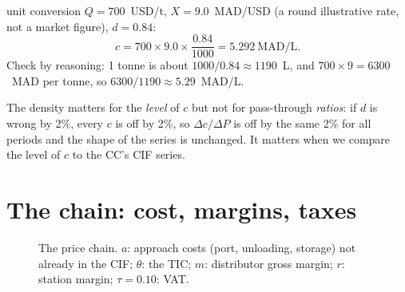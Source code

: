 \documentclass[11pt,a4paper]{article}
\theoremstyle{definition}
\newcommand{\MADL}{\text{MAD/L}}
\begin{document}
\begin{worked}{unit conversion}
$Q=700$~USD/t, $X=9.0$~MAD/USD (a round illustrative rate, not a market figure), $d=0.84$:
\[
c = 700 \times 9.0 \times \frac{0.84}{1000} = 5.292~\MADL .
\]
Check by reasoning: 1 tonne is about $1000/0.84 \approx 1190$~L, and $700\times 9 = 6300$~MAD per tonne,
so $6300/1190 \approx 5.29$~MAD/L.
\end{worked}

\begin{warning}
The density matters for the \emph{level} of $c$ but not for pass-through \emph{ratios}: if $d$ is
wrong by 2\%, every $c$ is off by 2\%, so $\Delta c/\Delta P$ is off by the same 2\% for all periods
and the shape of the series is unchanged. It matters when we compare the level of $c$ to the CC's
CIF series.
\end{warning}

\section{The chain: cost, margins, taxes}

\begin{figure}[H]
\centering
{}
\caption{The price chain. $a$: approach costs (port, unloading, storage) not already in the CIF;
$\theta$: the TIC; $m$: distributor gross margin; $r$: station margin; $\tau=0.10$: VAT.}
\label{fig:chain}
\end{figure}
\end{document}
